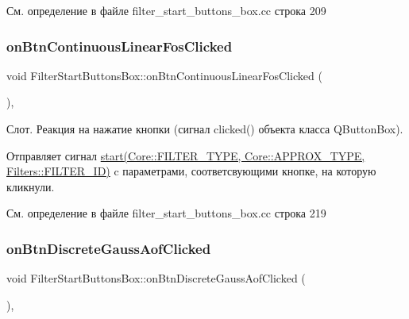 См. определение в файле filter\+\_\+start\+\_\+buttons\+\_\+box.\+cc строка 209

\hypertarget{class_filter_start_buttons_box_a2dafb5ddb0f1c4dbf1a5e88d356b5fdc}{}\label{class_filter_start_buttons_box_a2dafb5ddb0f1c4dbf1a5e88d356b5fdc} 
\subsubsection{\texorpdfstring{on\+Btn\+Continuous\+Linear\+Fos\+Clicked}{onBtnContinuousLinearFosClicked}}
{\footnotesize\ttfamily void Filter\+Start\+Buttons\+Box\+::on\+Btn\+Continuous\+Linear\+Fos\+Clicked (\begin{DoxyParamCaption}{ }\end{DoxyParamCaption})\hspace{0.3cm}{\ttfamily [private]}, {\ttfamily [slot]}}

Слот. Реакция на нажатие кнопки (сигнал clicked() объекта класса Q\+Button\+Box).

Отправляет сигнал \hyperlink{class_filter_start_buttons_box_ac6e2a6555f1d388391f188f834b8e753}{start(\+Core\+::\+F\+I\+L\+T\+E\+R\+\_\+\+T\+Y\+P\+E, Core\+::\+A\+P\+P\+R\+O\+X\+\_\+\+T\+Y\+P\+E, Filters\+::\+F\+I\+L\+T\+E\+R\+\_\+\+I\+D)} c параметрами, соответсвующими кнопке, на которую кликнули. 

См. определение в файле filter\+\_\+start\+\_\+buttons\+\_\+box.\+cc строка 219

\hypertarget{class_filter_start_buttons_box_a08891ce1d3fc71d2358ba9f48e076fd7}{}\label{class_filter_start_buttons_box_a08891ce1d3fc71d2358ba9f48e076fd7} 
\subsubsection{\texorpdfstring{on\+Btn\+Discrete\+Gauss\+Aof\+Clicked}{onBtnDiscreteGaussAofClicked}}
{\footnotesize\ttfamily void Filter\+Start\+Buttons\+Box\+::on\+Btn\+Discrete\+Gauss\+Aof\+Clicked (\begin{DoxyParamCaption}{ }\end{DoxyParamCaption})\hspace{0.3cm}{\ttfamily [private]}, {\ttfamily [slot]}}

